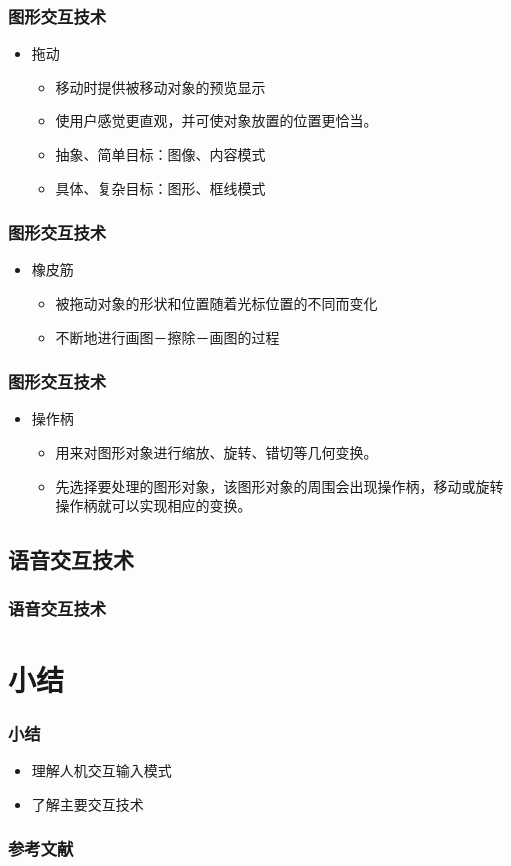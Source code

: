 \documentclass{beamer}
\begin{document}
\begin{frame}
	\frametitle{图形交互技术}
	\begin{itemize}
		\item 拖动
		\begin{itemize}
			\item 移动时提供被移动对象的预览显示
			\item 使用户感觉更直观，并可使对象放置的位置更恰当。
			\item 抽象、简单目标：图像、内容模式
			\item 具体、复杂目标：图形、框线模式
		\end{itemize}
	\end{itemize}
\end{frame}

\begin{frame}
	\frametitle{图形交互技术}
	\begin{itemize}
		\item 橡皮筋
		\begin{itemize}
			\item 被拖动对象的形状和位置随着光标位置的不同而变化
			\item 不断地进行画图－擦除－画图的过程
		\end{itemize}
	\end{itemize}
\end{frame}

\begin{frame}
	\frametitle{图形交互技术}
	\begin{itemize}
		\item 操作柄
		\begin{itemize}
			\item 用来对图形对象进行缩放、旋转、错切等几何变换。
			\item 先选择要处理的图形对象，该图形对象的周围会出现操作柄，移动或旋转操作柄就可以实现相应的变换。
		\end{itemize}
	\end{itemize}
\end{frame}

\subsection{语音交互技术}
\begin{frame}
	\frametitle{语音交互技术}

\end{frame}

%

\section{小结}
\begin{frame}
	\frametitle{小结}
	\begin{itemize}
		\item 理解人机交互输入模式
		\item 了解主要交互技术
	\end{itemize}
\end{frame}
 
\begin{frame}
	\frametitle{参考文献}
	
	
\end{frame}
\end{document}
